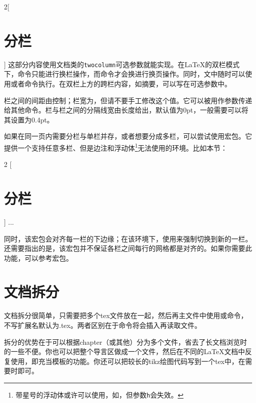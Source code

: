 \begin{multicols}{2}[\section{分栏}]
这部分内容使用文档类的\texttt{two\-column}可选参数就能实现。在\LaTeX 的双栏模式下，命令只能进行换栏操作，而命令才会换进行换页操作。同时，文中随时可以使用或者命令执行。在双栏上方的跨栏内容，如摘要，可以写在可选参数中。

栏之间的间距由控制；栏宽为，但请不要手工修改这个值。它可以被用作参数传递给其他命令。栏与栏之间的分隔线宽由长度给出，默认值为0pt，一般需要可以将其设置为0.4pt。 

如果在同一页内需要分栏与单栏并存，或者想要分成多栏，可以尝试使用宏包。它提供一个支持任意多栏、但是边注和浮动体\footnote{带星号的浮动体或许可以使用，如，但参数\texttt{h}会失效。}无法使用的环境。比如本节：
\begin{latex}
\begin{multicols}{2}
  [\section{分栏}]
  ...
\end{multicols}
\end{latex}

同时，该宏包会对齐每一栏的下边缘；在该环境下，使用来强制切换到新的一栏。还需要指出的是，该宏包并不保证各栏之间每行的网格都是对齐的。如果你需要此功能，可以参考宏包。
\end{multicols}

\section{文档拆分}
\label{sec:include}
文档拆分很简单，只需要把多个tex文件放在一起，然后再主文件中使用或命令，不写扩展名默认为.tex。两者区别在于命令将会插入再读取文件。

拆分的优势在于可以根据chapter（或其他）分为多个文件，省去了长文档浏览时的一些不便。你也可以把整个导言区做成一个文件，然后在不同的\LaTeX 文档中反复使用，即充当模板的功能。你还可以把较长的tikz绘图代码写到一个tex中，在需要时即可。

